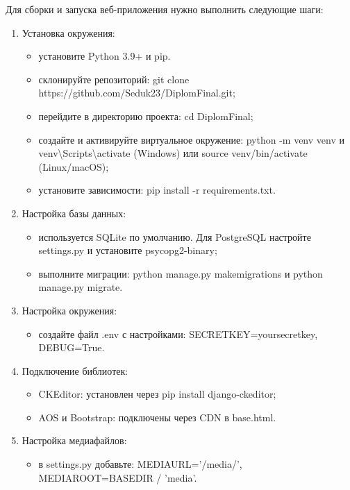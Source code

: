 Для сборки и запуска веб-приложения нужно выполнить следующие шаги:

\begin{enumerate}
	\item Установка окружения:
	\begin{itemize}
		\item установите Python 3.9+ и pip.
		\item склонируйте репозиторий: git clone https://github.com/Seduk23/DiplomFinal.git;
		\item перейдите в директорию проекта: cd DiplomFinal;
		\item создайте и активируйте виртуальное окружение: python -m venv venv и venv\textbackslash Scripts\textbackslash activate (Windows) или source venv/bin/activate (Linux/macOS);
		\item установите зависимости: pip install -r requirements.txt.
	\end{itemize}
	
	\item Настройка базы данных:
	\begin{itemize}
		\item используется SQLite по умолчанию. Для PostgreSQL настройте settings.py и установите psycopg2-binary;
		\item выполните миграции: python manage.py makemigrations и python manage.py migrate.
	\end{itemize}
	
	\item Настройка окружения:
	\begin{itemize}
		\item создайте файл .env с настройками: SECRETKEY=yoursecretkey, DEBUG=True.
	\end{itemize}
	
	\item Подключение библиотек:
	\begin{itemize}
		\item CKEditor: установлен через pip install django-ckeditor;
		\item AOS и Bootstrap: подключены через CDN в base.html.
	\end{itemize}
	
	\item Настройка медиафайлов:
	\begin{itemize}
		\item в settings.py добавьте: MEDIAURL='/media/', MEDIAROOT=BASEDIR / 'media'.
	\end{itemize}
	

\end{enumerate}
